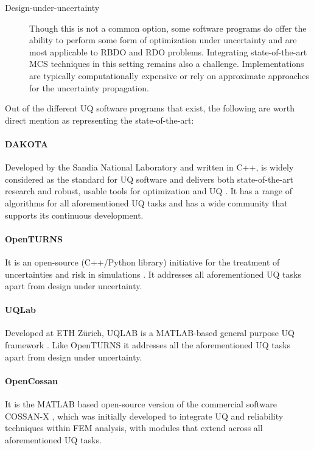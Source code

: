 \begin{description}
    \item[Design-under-uncertainty]{Though this is not a common option, some software programs do offer the ability to perform some form of optimization under uncertainty and are most applicable to RBDO and RDO problems. Integrating state-of-the-art MCS techniques in this setting remains also a challenge. Implementations are typically computationally expensive or rely on approximate approaches for the uncertainty propagation.}
\end{description}

\noindent Out of the different UQ software programs that exist, the following are worth direct mention as representing the state-of-the-art: 

\paragraph{DAKOTA} Developed by the Sandia National Laboratory and written in C++,  is widely considered as the standard for UQ software and delivers both state-of-the-art research and robust, usable tools for optimization and UQ \citep{adams2009dakota}. It has a range of algorithms for all aforementioned UQ tasks and has a wide community that supports its continuous development. 

\paragraph{OpenTURNS} It is an open-source (C++/Python library) initiative for the treatment of uncertainties and risk in simulations \citep{andrianov2007open}. It addresses all aforementioned UQ tasks apart from design under uncertainty. 

\paragraph{UQLab} Developed at ETH Zürich, UQLAB is a MATLAB-based general purpose UQ framework \citep{marelli2014uqlab}. Like OpenTURNS it addresses all the aforementioned UQ tasks apart from design under uncertainty. 

\paragraph{OpenCossan} It is the MATLAB based open-source version of the commercial software COSSAN-X \citep{patelli2017cossan}, which was initially developed to integrate UQ and reliability techniques within FEM analysis, with modules that extend across all aforementioned UQ tasks.

